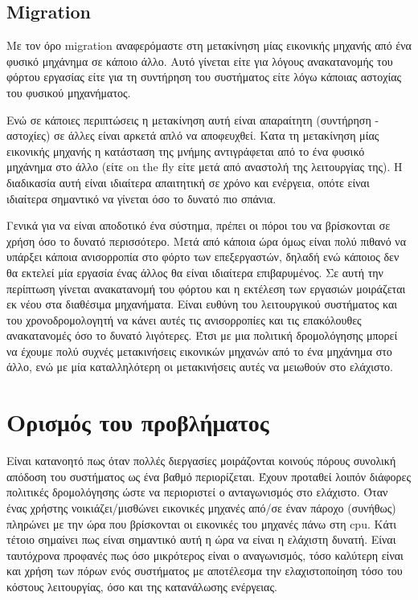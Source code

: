 \subsection{Migration}
Με τον όρο migration αναφερόμαστε στη μετακίνηση μίας εικονικής μηχανής από ένα
φυσικό μηχάνημα σε κάποιο άλλο. Αυτό γίνεται είτε για λόγους ανακατανομής του
φόρτου εργασίας είτε για τη συντήρηση του συστήματος είτε λόγω κάποιας αστοχίας
του φυσικού μηχανήματος.

Ενώ σε κάποιες περιπτώσεις η μετακίνηση αυτή είναι
απαραίτητη (συντήρηση - αστοχίες) σε άλλες είναι αρκετά απλό να αποφευχθεί.
Κατα τη μετακίνηση μίας εικονικής μηχανής η κατάσταση της μνήμης αντιγράφεται
από το ένα φυσικό μηχάνημα στο άλλο (είτε on the fly είτε μετά από αναστολή της
λειτουργίας της). Η διαδικασία αυτή είναι ιδιαίτερα απαιτητική σε χρόνο και
ενέργεια, οπότε είναι ιδιαίτερα σημαντικό να γίνεται όσο το δυνατό πιο σπάνια.

Γενικά για να είναι αποδοτικό ένα σύστημα, πρέπει οι πόροι του να βρίσκονται σε
χρήση όσο το δυνατό περισσότερο. Μετά από κάποια ώρα όμως είναι πολύ πιθανό να
υπάρξει κάποια ανισορροπία στο φόρτο των επεξεργαστών, δηλαδή ενώ κάποιος δεν θα
εκτελεί μία εργασία ένας άλλος θα είναι ιδιαίτερα επιβαρυμένος. Σε αυτή την
περίπτωση γίνεται ανακατανομή του φόρτου και η εκτέλεση των εργασιών μοιράζεται
εκ νέου στα διαθέσιμα μηχανήματα. Είναι ευθύνη του λειτουργικού συστήματος και
του χρονοδρομολογητή να κάνει αυτές τις ανισορροπίες και τις επακόλουθες
ανακατανομές όσο το δυνατό λιγότερες. Έτσι με μια πολιτική δρομολόγησης μπορεί
να έχουμε πολύ συχνές μετακινήσεις εικονικών μηχανών από το ένα μηχάνημα στο
άλλο, ενώ με μία καταλληλότερη οι μετακινήσεις αυτές να μειωθούν στο ελάχιστο.

\section{Ορισμός του προβλήματος}
Είναι κατανοητό πως όταν πολλές διεργασίες μοιράζονται κοινούς πόρους συνολική
απόδοση του συστήματος ως ένα βαθμό περιορίζεται. Έχουν προταθεί λοιπόν διάφορες
πολιτικές δρομολόγησης ώστε να περιοριστεί ο ανταγωνισμός στο ελάχιστο. Όταν
ένας χρήστης νοικιάζει/μισθώνει εικονικές μηχανές από/σε έναν πάροχο (συνήθως)
πληρώνει με την ώρα που βρίσκονται οι εικονικές του μηχανές πάνω στη cpu. Κάτι
τέτοιο σημαίνει πως είναι σημαντικό αυτή η ώρα να είναι η ελάχιστη δυνατή. Είναι
ταυτόχρονα προφανές πως όσο μικρότερος είναι ο αναγωνισμός, τόσο καλύτερη είναι
και χρήση των πόρων ενός συστήματος με αποτέλεσμα την ελαχιστοποίηση τόσο του
κόστους λειτουργίας, όσο και της κατανάλωσης ενέργειας.

